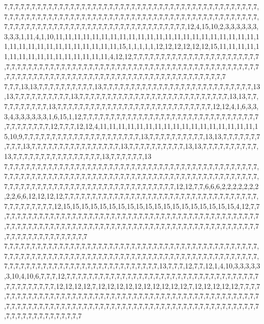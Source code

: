 7,7,7,7,7,7,7,7,7,7,7,7,7,7,7,7,7,7,7,7,7,7,7,7,7,7,7,7,7,7,7,7,7,7,7,7,7,7,7,7,7,7,7,7,7,7,7,7,7,7,7,7,7,7,7,7,7,7,7,7,7,7,7,7,7,7,7,7,7,7,7,7,7,7,7,7,7,7,7,7,7,7,7,7,7,7,7,7,7,7,7,7,7,7,7,7,7,7,7,7,7,7,7,7,7,7,7,7,7,7,7,7,7,7,7,7,7,7,7,7,7,7,7,7,7,12,4,15,10,2,3,3,3,3,3,3,3,3,3,1,11,4,1,10,11,11,11,11,11,11,11,11,11,11,11,11,11,11,11,11,11,11,11,11,11,11,11,11,11,11,11,11,11,11,11,11,11,11,11,15,1,1,1,1,1,12,12,12,12,12,12,15,11,11,11,11,11,11,11,11,11,11,11,11,11,11,11,11,4,12,12,7,7,7,7,7,7,7,7,7,7,7,7,7,7,7,7,7,7,7,7,7,7,7,7,7,7,7,7,7,7,7,7,7,7,7,7,7,7,7,7,7,7,7,7,7,7,7,7,7,7,7,7,7,7,7,7,7,7,7,7,7,7,7,7,7,7,7,7,7,7,7,7,7,7,7,7,7,7,7,7,7,7,7,7,7,7,7,7,7,7,7,7,7,7,7,7,7,7,7,7,7,7,7,7,7,7,7,7,7
7,7,7,13,13,7,7,7,7,7,7,7,7,7,7,13,7,7,7,7,7,7,7,7,7,7,7,7,7,7,7,7,7,7,7,7,7,7,7,7,7,7,7,13,13,7,7,7,7,7,7,7,7,7,7,13,7,7,7,7,7,7,7,7,7,7,7,7,7,7,7,7,7,7,7,7,7,7,7,7,7,7,7,13,13,7,7,7,7,7,7,7,7,7,7,13,7,7,7,7,7,7,7,7,7,7,7,7,7,7,7,7,7,7,7,7,7,7,7,7,7,7,7,7,12,12,4,1,6,3,3,3,4,3,3,3,3,3,3,1,6,15,1,12,7,7,7,7,7,7,7,7,7,7,7,7,7,7,7,7,7,7,7,7,7,7,7,7,7,7,7,7,7,7,7,7,7,7,7,7,7,7,7,7,12,7,7,7,12,12,4,11,11,11,11,11,11,11,11,11,11,11,11,11,11,11,11,11,15,10,9,7,7,7,7,7,7,7,7,7,7,7,7,7,7,7,7,7,7,7,7,7,13,7,7,7,7,7,7,7,7,7,7,13,13,7,7,7,7,7,7,7,7,7,7,13,7,7,7,7,7,7,7,7,7,7,7,7,7,7,7,7,13,7,7,7,7,7,7,7,7,7,7,13,13,7,7,7,7,7,7,7,7,7,7,13,7,7,7,7,7,7,7,7,7,7,7,7,7,7,7,7,13,7,7,7,7,7,7,13
7,7,7,7,7,7,7,7,7,7,7,7,7,7,7,7,7,7,7,7,7,7,7,7,7,7,7,7,7,7,7,7,7,7,7,7,7,7,7,7,7,7,7,7,7,7,7,7,7,7,7,7,7,7,7,7,7,7,7,7,7,7,7,7,7,7,7,7,7,7,7,7,7,7,7,7,7,7,7,7,7,7,7,7,7,7,7,7,7,7,7,7,7,7,7,7,7,7,7,7,7,7,7,7,7,7,7,7,7,7,7,7,7,7,7,7,7,7,7,7,7,7,7,12,12,7,7,6,6,6,2,2,2,2,2,2,2,2,2,6,6,12,12,12,12,7,7,7,7,7,7,7,7,7,7,7,7,7,7,7,7,7,7,7,7,7,7,7,7,7,7,7,7,7,7,7,7,7,7,7,7,7,7,7,7,7,7,7,7,12,15,15,15,15,15,15,15,15,15,15,15,15,15,15,15,15,15,15,15,4,12,7,7,7,7,7,7,7,7,7,7,7,7,7,7,7,7,7,7,7,7,7,7,7,7,7,7,7,7,7,7,7,7,7,7,7,7,7,7,7,7,7,7,7,7,7,7,7,7,7,7,7,7,7,7,7,7,7,7,7,7,7,7,7,7,7,7,7,7,7,7,7,7,7,7,7,7,7,7,7,7,7,7,7,7,7,7,7,7,7,7,7,7,7,7,7,7,7,7,7,7,7,7,7,7,7,7,7,7,7
7,7,7,7,7,7,7,7,7,7,7,7,7,7,7,7,7,7,7,7,7,7,7,7,7,7,7,7,7,7,7,7,7,7,7,7,7,7,7,7,7,7,7,7,7,7,7,7,7,7,7,7,7,7,7,7,7,7,7,7,7,7,7,7,7,7,7,7,7,7,7,7,7,7,7,7,7,7,7,7,7,7,7,7,7,7,7,7,7,7,7,7,7,7,7,7,7,7,7,7,7,7,7,7,7,7,7,7,7,7,7,7,7,7,7,7,7,7,7,7,13,7,7,7,12,7,7,12,1,4,10,3,3,3,3,3,3,10,4,10,6,7,7,7,12,7,7,7,7,7,7,7,7,7,7,7,7,7,7,7,7,7,7,7,7,7,7,7,7,7,7,7,7,7,7,7,7,7,7,7,7,7,7,7,7,7,7,7,7,12,12,12,12,7,12,12,12,12,12,12,12,12,12,12,7,12,12,12,12,12,7,7,7,7,7,7,7,7,7,7,7,7,7,7,7,7,7,7,7,7,7,7,7,7,7,7,7,7,7,7,7,7,7,7,7,7,7,7,7,7,7,7,7,7,7,7,7,7,7,7,7,7,7,7,7,7,7,7,7,7,7,7,7,7,7,7,7,7,7,7,7,7,7,7,7,7,7,7,7,7,7,7,7,7,7,7,7,7,7,7,7,7,7,7,7,7,7,7,7,7,7,7,7,7,7,7,7,7,7,7
